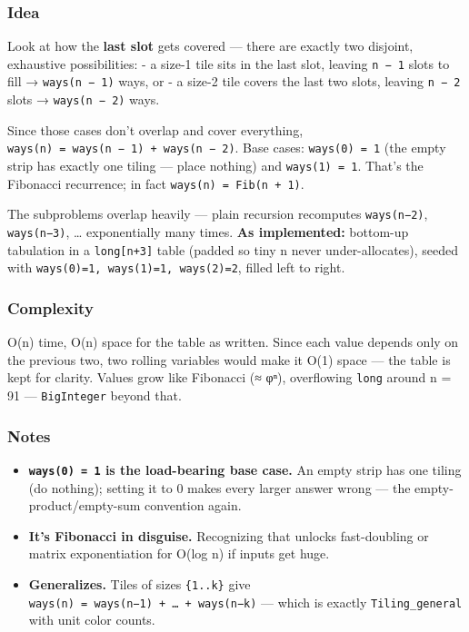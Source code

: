 \documentclass[
  10pt,
  letterpaper,
  onecolumn]{article}
\providecommand{\tightlist}{%
  \setlength{\itemsep}{0pt}\setlength{\parskip}{0pt}}
\begin{document}
\hypertarget{idea-8}{%
\subsubsection{Idea}\label{idea-8}}

Look at how the \textbf{last slot} gets covered --- there are exactly
two disjoint, exhaustive possibilities: - a size-1 tile sits in the last
slot, leaving \texttt{n\ −\ 1} slots to fill → \texttt{ways(n\ −\ 1)}
ways, or - a size-2 tile covers the last two slots, leaving
\texttt{n\ −\ 2} slots → \texttt{ways(n\ −\ 2)} ways.

Since those cases don't overlap and cover everything,
\texttt{ways(n)\ =\ ways(n\ −\ 1)\ +\ ways(n\ −\ 2)}. Base cases:
\texttt{ways(0)\ =\ 1} (the empty strip has exactly one tiling --- place
nothing) and \texttt{ways(1)\ =\ 1}. That's the Fibonacci recurrence; in
fact \texttt{ways(n)\ =\ Fib(n\ +\ 1)}.

The subproblems overlap heavily --- plain recursion recomputes
\texttt{ways(n−2)}, \texttt{ways(n−3)}, \ldots{} exponentially many
times. \textbf{As implemented:} bottom-up tabulation in a
\texttt{long{[}n+3{]}} table (padded so tiny n never under-allocates),
seeded with \texttt{ways(0)=1,\ ways(1)=1,\ ways(2)=2}, filled left to
right.

\hypertarget{complexity-8}{%
\subsubsection{Complexity}\label{complexity-8}}

O(n) time, O(n) space for the table as written. Since each value depends
only on the previous two, two rolling variables would make it O(1) space
--- the table is kept for clarity. Values grow like Fibonacci (≈ φⁿ),
overflowing \texttt{long} around n = 91 --- \texttt{BigInteger} beyond
that.

\hypertarget{notes-6}{%
\subsubsection{Notes}\label{notes-6}}

\begin{itemize}
\tightlist
\item
  \textbf{\texttt{ways(0)\ =\ 1} is the load-bearing base case.} An
  empty strip has one tiling (do nothing); setting it to 0 makes every
  larger answer wrong --- the empty-product/empty-sum convention again.
\item
  \textbf{It's Fibonacci in disguise.} Recognizing that unlocks
  fast-doubling or matrix exponentiation for O(log n) if inputs get
  huge.
\item
  \textbf{Generalizes.} Tiles of sizes \texttt{\{1..k\}} give
  \texttt{ways(n)\ =\ ways(n−1)\ +\ …\ +\ ways(n−k)} --- which is
  exactly \texttt{Tiling\_general} with unit color counts.
\end{itemize}
\end{document}
